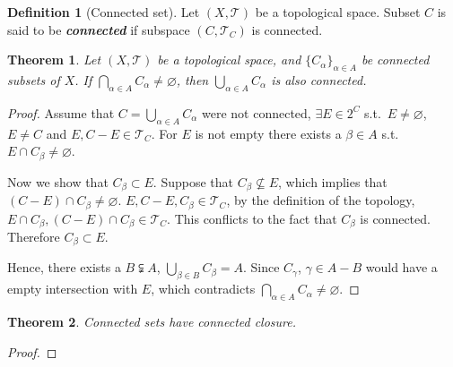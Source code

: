 \documentclass[openany]{book}
\newcommand*{\indexbf}[1]{\emph{\textbf{#1}}\index{#1}} %
\theoremstyle{plain}
\newtheorem{theorem}{Theorem}[section] %
\theoremstyle{definition}
\newtheorem{definition}{Definition}[section] %
\begin{document}
\begin{definition}[Connected set]\label{definition: connected set}
	Let $(X, \mathscr T)$ be a topological space. 
	Subset $C$ is said to be \indexbf{connected}%
	if subspace $(C, \mathscr T_C)$ is connected. 
\end{definition}

\begin{theorem}\label{theorem: union of connected sets}
	Let $(X, \mathscr T)$ be a topological space, and $\{C_\alpha\}_{\alpha \in A}$ be connected subsets of $X$. 
	If $\bigcap_{ \alpha \in A} C_\alpha \neq \varnothing$, then $\bigcup\limits_{\alpha \in A} C_\alpha$ is also connected. 
\end{theorem}
\begin{proof}
	Assume that $C = \bigcup_{\alpha \in A} C_\alpha$ were not connected, $\exists E \in 2^C$ s.t.\ $E \neq \varnothing$, $E \neq C$ and $E, C - E \in \mathscr T_C$. 
	For $E$ is not empty there exists a $\beta \in A$ s.t.\ $E \cap C_\beta \neq \varnothing$. 
	
	Now we show that $C_\beta \subset  E$.
	Suppose that $C_\beta \nsubseteq  E$, which implies that $(C - E) \cap C_\beta \neq \varnothing$. 
	$E, C - E, C_\beta \in \mathscr T_C$, by the definition of the topology, 
	$E \cap C_\beta, (C - E) \cap C_\beta \in \mathscr T_C$. 
	This conflicts to the fact that $C_\beta$ is connected. 
	Therefore $C_\beta \subset  E$. 

	Hence, there exists a $B \subsetneqq A$, $\bigcup_{ \beta \in B} C_\beta = A$. 
	Since $C_\gamma$, $\gamma \in A - B$ would have a empty intersection with $E$, which contradicts $\bigcap_{ \alpha \in A} C_\alpha \neq \varnothing$.
\end{proof}

\begin{theorem}\label{theorem: closure of connected set}
	Connected sets have connected closure.
\end{theorem}
\begin{proof}

\end{proof}
\end{document}
